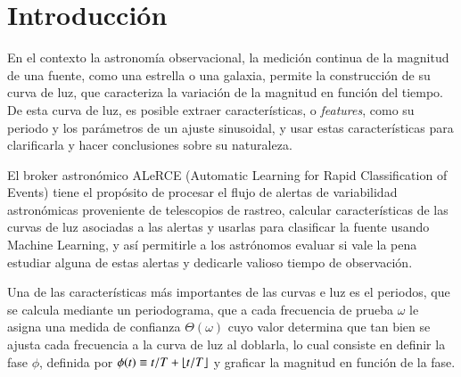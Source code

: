 \newcommand{\Lepp}[1]{\mbox{Lepp}(#1)}
\theoremstyle{definition}
\newtheorem{definition}{Definición}[section]

\newtheorem{theorem}{Teorema}


\newtheorem{lemma}[theorem]{Lema}

\newcommand{\ttt}{\texttt}
\DeclarePairedDelimiter\ceil{\lceil}{\rceil}
\DeclarePairedDelimiter\floor{\lfloor}{\rfloor}
 
\chapter{Introducción}\label{chap:intro}
En el contexto la astronomía observacional, la medición continua de la magnitud de una fuente, como una estrella o una galaxia, permite la construcción de su curva de luz, que caracteriza la variación de la magnitud en función del tiempo. De esta curva de luz, es posible extraer características, o {\it features}, como su periodo y los parámetros de un ajuste sinusoidal, y usar estas características para clarificarla y hacer conclusiones sobre su naturaleza.%

El broker astronómico ALeRCE (Automatic Learning for Rapid Classification of Events) tiene el propósito de procesar el flujo de alertas de variabilidad astronómicas proveniente de telescopios de rastreo, calcular características de las curvas de luz asociadas a las alertas y usarlas para clasificar la fuente usando Machine Learning, y así permitirle a los astrónomos evaluar si vale la pena estudiar alguna de estas alertas y dedicarle valioso tiempo de observación. \cite{alerce-intro}

Una de las características más importantes de las curvas e luz es el periodos, que se calcula mediante un periodograma, que a cada frecuencia de prueba $\omega$ le asigna una medida de confianza $\Theta(\omega)$ cuyo valor determina que tan bien se ajusta cada frecuencia a la curva de luz al doblarla, lo cual consiste en definir la fase $\phi$, definida por $\phi(t) \equiv t/T + \floor{t/T}$ y graficar la magnitud en función de la fase.

